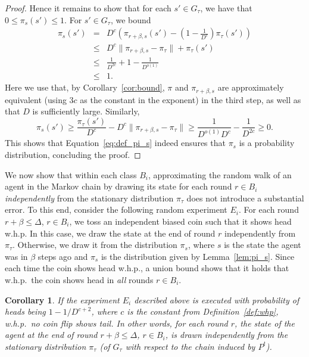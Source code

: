 \documentclass[11pt]{article}
\newtheorem{corollary}[theorem]{Corollary}
\begin{document}
\begin{proof}
	Hence it remains to show that for each $s'\in G_{\tau}$, we have that $0\leq \pi_s(s')\leq 1$. For $s'\in G_{\tau}$, we bound
	\begin{eqnarray*}
	\pi_s(s') &=& D^c\left(\pi_{r+\beta,s}(s')-\left(1 - \frac{1}{D^c}\right) \pi_{\tau}(s')\right)\\
	&\leq & D^c\|\pi_{r+\beta,s}-\pi_{\tau}\|+\pi_{\tau}(s')\\
	&\leq & \frac{1}{D^{2c}}+1-\frac{1}{D^{o(1)}}\\
	&\leq & 1.
	\end{eqnarray*}
	Here we use that, by Corollary~\ref{cor:bound}, $\pi$ and $\pi_{r+\beta,s}$ are approximately equivalent (using $3c$ as the constant in the exponent) in the third step, as well as that $D$ is sufficiently large. Similarly,
\begin{equation*}
\pi_s(s') \geq \frac{\pi_{\tau}(s')}{D^c}-D^c\|\pi_{r+\beta,s}-\pi_{\tau}\|
\geq \frac{1}{D^{o(1)}D^c}-\frac{1}{D^{2c}} \geq 0.
\end{equation*}
This shows that Equation~\eqref{eq:def_pi_s} indeed ensures that $\pi_s$ is a probability distribution, concluding the proof.
\end{proof}

We now show that within each class $B_i$, approximating the random walk of an agent in the Markov chain by drawing its state for each round $r\in B_i$ \emph{independently} from the stationary distribution $\pi_{\tau}$ does not introduce a substantial error. To this end, consider the following random experiment $E_i$. For each round $r+\beta\leq \Delta$, $r\in B_i$, we toss an independent biased coin such that it shows head w.h.p. In this case, we draw the state at the end of round $r$ independently from $\pi_{\tau}$. Otherwise, we draw it from the distribution $\pi_s$, where $s$ is the state the agent was in $\beta$ steps ago and $\pi_s$ is the distribution given by Lemma~\ref{lem:pi_s}. Since each time the coin shows head w.h.p., a union bound shows that it holds that w.h.p.\ the coin shows head in \emph{all} rounds $r\in B_i$.

\begin{corollary}\label{cor:coin}
	If the experiment $E_i$ described above is executed with probability of heads being $1-1/D^{c+2}$, where $c$ is the constant from Definition~\ref{def:whp}, w.h.p.\ no coin flip shows tail. In other words, for each round $r$, the state of the agent at the end of round $r+\beta\leq \Delta$, $r\in B_i$, is drawn independently from the stationary distribution $\pi_{\tau}$ (of $G_{\tau}$ with respect to the chain induced by $P^t$).
\end{corollary}
\end{document}
